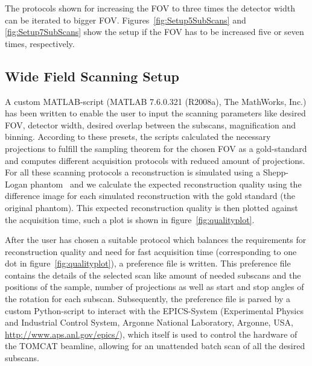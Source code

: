 The protocols shown for increasing the FOV to three times the detector width can be iterated to bigger FOV. Figures~\ref{fig:Setup5SubScans} and \ref{fig:Setup7SubScans} show the setup if the FOV has to be increased five or seven times, respectively.

\begin{figure*}[htp]
	\centering%
	\caption[Setup for 5 SubScans]{Setup; desired FOV and two variants of covering the desired FOV with 25 independent small scans or 5 subscans.}%
	\label{fig:Setup5SubScans}%
\end{figure*}

\begin{figure*}[htp]
	\centering%
	\caption[Setup for 7 SubScans]{Setup; desired FOV and two variants of covering the desired FOV with 49 independent small scans or 7 subscans.}%
	\label{fig:Setup7SubScans}%
\end{figure*}
\cbend

\subsection{Wide Field Scanning Setup}
\label{subsec:wfs-setup}%
\cbstart
A custom MATLAB-script (MATLAB\textsuperscript{\textregistered} 7.6.0.321 (R2008a), The MathWorks, Inc.) has been written to enable the user to input the scanning parameters like desired FOV, detector width, desired overlap between the subscans, magnification and binning. According to these presets, the scripts calculated the necessary projections to fulfill the sampling theorem for the chosen FOV as a gold-standard and computes different acquisition protocols with reduced amount of projections. For all these scanning protocols a reconstruction is simulated using a Shepp-Logan phantom~\cite{Shepp1974} and we calculate the expected reconstruction quality using the difference image for each simulated reconstruction with the gold standard (the original phantom). This expected reconstruction quality is then plotted against the acquisition time, such a plot is shown in figure~\ref{fig:qualityplot}.

After the user has chosen a suitable protocol which balances the requirements for reconstruction quality and need for fast acquisition time (corresponding to one dot in figure~\ref{fig:qualityplot}), a preference file is written. This preference file contains the details of the selected scan like amount of needed subscans and the positions of the sample, number of projections as well as start and stop angles of the rotation for each subscan. Subsequently, the preference file is parsed by a custom Python-script to interact with the EPICS-System (Experimental Physics and Industrial Control System, Argonne National Laboratory, Argonne, USA, \url{http://www.aps.anl.gov/epics/}), which itself is used to control the hardware of the TOMCAT beamline, allowing for an unattended batch scan of all the desired subscans.
\cbend

